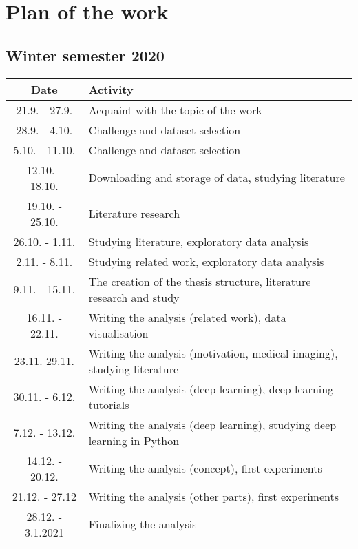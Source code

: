 
\chapter{Plan of the work} 

\section{Winter semester 2020}
\begin{tabular}{ |c|m{12cm}| } 
 \hline
 Date & Activity \\
 \hline
 \hline
 21.9. - 27.9. & Acquaint with the topic of the work\\ 
 \hline
 28.9. - 4.10. & Challenge and dataset selection \\ 
 \hline
 5.10. - 11.10. & Challenge and dataset selection \\ 
 \hline
 12.10. - 18.10. & Downloading and storage of data, studying literature \\ 
 \hline
 19.10. - 25.10. & Literature research\\ 
 \hline
 26.10. - 1.11. & Studying literature, exploratory data analysis \\ 
 \hline
 2.11. - 8.11. & Studying related work, exploratory data analysis \\
 \hline
 9.11. - 15.11. & The creation of the thesis structure, literature research and study \\ 
 \hline
 16.11. - 22.11. & Writing the analysis (related work), data visualisation \\ 
 \hline
 23.11. 29.11. & Writing the analysis (motivation, medical imaging), studying literature \\ 
 \hline
 30.11. - 6.12. & Writing the analysis (deep learning), deep learning tutorials \\ 
 \hline
 7.12. - 13.12. & Writing the analysis (deep learning), studying deep learning in Python \\ 
 \hline
 14.12. - 20.12. & Writing the analysis (concept), first experiments \\ 
 \hline
 21.12. - 27.12 & Writing the analysis (other parts), first experiments \\ 
 \hline
 28.12. - 3.1.2021 & Finalizing the analysis \\ 
 \hline
\end{tabular}



